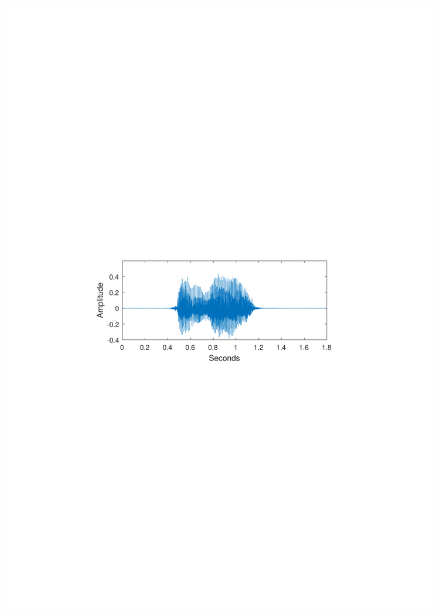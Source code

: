 \begin{figure}[htbp]
\centering
\begin{minipage}[b]{0.48\textwidth}
\centering
\includegraphics[width=1.00\textwidth]{figures/Hello_waveform.pdf} %
\end{minipage}%
\hfill
\begin{minipage}[b]{0.48\textwidth}
\centering

\end{minipage}
\end{figure}
